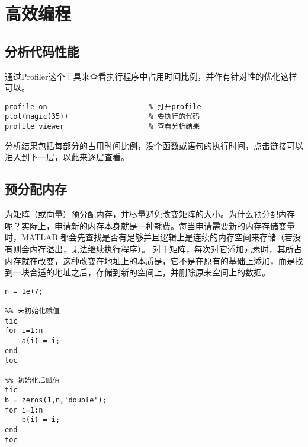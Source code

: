 \section{高效编程}

\subsection{分析代码性能}

通过Profiler这个工具来查看执行程序中占用时间比例，并作有针对性的优化这样可以。

\vspace{-0.8cm}
\begin{lstlisting}[caption = 用Profiler分析代码性能] 
profile on                        % 打开profile
plot(magic(35))                   % 要执行的代码
profile viewer                    % 查看分析结果
\end{lstlisting}

分析结果包括每部分的占用时间比例，没个函数或语句的执行时间，点击链接可以进入到下一层，以此来逐层查看。







\subsection{预分配内存}

为矩阵（或向量）预分配内存，并尽量避免改变矩阵的大小。为什么预分配内存呢？实际上，申请新的内存本身就是一种耗费。每当申请需要新的内存存储变量时，MATLAB 都会先查找是否有足够并且逻辑上是连续的内存空间来存储（若没有则会内存溢出，无法继续执行程序）。 对于矩阵，每次对它添加元素时，其所占内存就在改变，这种改变在地址上的本质是，它不是在原有的基础上添加，而是找到一块合适的地址之后，存储到新的空间上，并删除原来空间上的数据。

\vspace{-0.8cm}
\begin{lstlisting}[caption = 是否预分配内存效率对比]
n = 1e+7;

%% 未初始化赋值
tic
for i=1:n
    a(i) = i;
end
toc

%% 初始化后赋值
tic
b = zeros(1,n,'double');
for i=1:n
    b(i) = i;
end
toc
\end{lstlisting}

